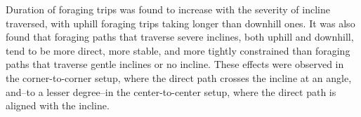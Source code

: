 Duration of foraging trips was found to increase with the severity of incline traversed, with uphill foraging trips taking longer than downhill ones. It was also found that foraging paths that traverse severe inclines, both uphill and downhill, tend to be more direct, more stable, and more tightly constrained than foraging paths that traverse gentle inclines or no incline. These effects were observed in the corner-to-corner setup, where the direct path crosses the incline at an angle, and--to a lesser degree--in the center-to-center setup, where the direct path is aligned with the incline.